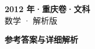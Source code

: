 \documentclass[zihao=-4, a4paper]{ctexart}
\begin{document}
\begin{center}
  {\Large\bfseries 2012 年·重庆卷·文科}\\[4pt]
  {\large 数学 · 解析版}
\end{center}
\medskip
{}

\clearpage
{}
\begin{center}{\Large\bfseries 参考答案与详细解析}\end{center}
\medskip

\end{document}
